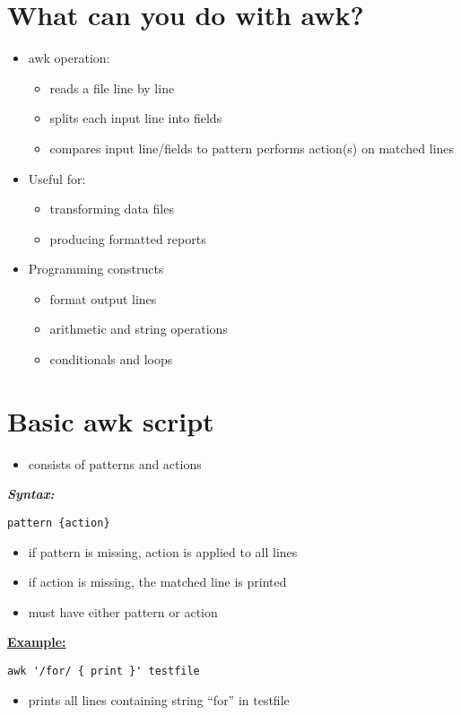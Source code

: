 \documentclass{report}
\begin{document}
\section{What can you do with awk?}
\begin{itemize}
  \item awk operation: 
    \begin{itemize}[label=$\circ$]
      \item reads a file line by line 
      \item splits each input line into fields
      \item compares input line/fields to pattern
        performs action(s) on matched lines
    \end{itemize}
  \item Useful for:
    \begin{itemize}[label=$\circ$]
      \item transforming data files 
      \item producing formatted reports
    \end{itemize}
  \item Programming constructs
    \begin{itemize}[label=$\circ$]
      \item format output lines 
      \item arithmetic and string operations
      \item conditionals and loops
    \end{itemize}
\end{itemize}
\section{Basic awk script}
\begin{itemize}
  \item consists of patterns and actions
\end{itemize}
\bigbreak \noindent
\textbf{\textit{Syntax:}}
\begin{verbatim}
pattern {action}
\end{verbatim}
\begin{itemize}
  \item if pattern is missing, action is applied to all lines
  \item if action is missing, the matched line is printed
  \item must have either pattern or action
\end{itemize}
\bigbreak \noindent
\textbf{\underline{Example:}}
\begin{mdframed}
\begin{verbatim}
awk '/for/ { print }' testfile
\end{verbatim}
\end{mdframed}
\begin{itemize}
\item prints all lines containing string ``for'' in testfile
\end{itemize}
\end{document}
